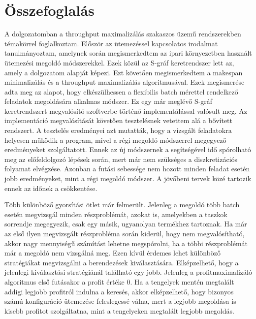 \chapter{Összefoglalás}
A dolgozatomban a throughput maximalizálás szakaszos üzemű rendszerekben témakörrel foglalkoztam.
Először az ütemezéssel kapcsolatos irodalmat tanulmányoztam, amelynek során megismerkedtem az ipari környezetben használt ütemezési megoldó módszerekkel.
Ezek közül az S-gráf keretrendszer lett az, amely a dolgozatom alapját képezi.
Ezt követően megismerkedtem a makespan minimalizálás és a throughput maximalizálás algoritmusával.
Ezek megismerése adta meg az alapot, hogy elkészülhessen a flexibilis batch mérettel rendelkező feladatok megoldására alkalmas módszer.
Ez egy már meglévő S-gráf keretrendszert megvalósító szoftverbe történő implementálással valósult meg.
Az implementáció megvalósítását követően tesztelésnek vetettem alá a bővített rendszert.
A tesztelés eredményei azt mutatták, hogy a vizsgált feladatokra helyesen működik a program, mivel a régi megoldó módszerrel megegyező eredményeket szolgáltatott.
Ennek az új módszernek a segítségével idő spórolható meg az előfeldolgozó lépések során, mert már nem szükséges a diszkretizációs folyamat elvégzése.
Azonban a futási sebessége nem hozott minden feladat esetén jobb eredményeket, mint a régi megoldó módszer.
A jövőbeni tervek közé tartozik ennek az időnek a csökkentése.

Több különböző gyorsítási ötlet már felmerült.
Jelenleg a megoldó több batch esetén megvizsgál minden részproblémát, azokat is,
amelyekben a taszkok sorrendje megegyezik, csak egy másik, ugyanolyan termékhez tartoznak.
Ha már az első ilyen megvizsgált részprobléma során kiderül, hogy nem megvalósítható, akkor nagy mennyiségű számítást lehetne megspórolni, ha a többi részproblémát már a megoldó nem vizsgálná meg.
Ezen kívül érdemes lehet különböző stratégiákat megvizsgálni a berendezések kiválasztására.
Elképzelhető, hogy a jelenlegi kiválasztási stratégiánál található egy jobb.
Jelenleg a profitmaximalizáló algoritmus első futásakor a profit értéke 0.
Ha a tengelyek mentén megtalált addigi legjobb profitról indulna a keresés, akkor elképzelhető, hogy bizonyos számú konfiguráció ütemezése feleslegessé válna, mert a legjobb megoldása is kisebb profitot szolgáltatna, mint a tengelyeken megtalált legjobb megoldás.
